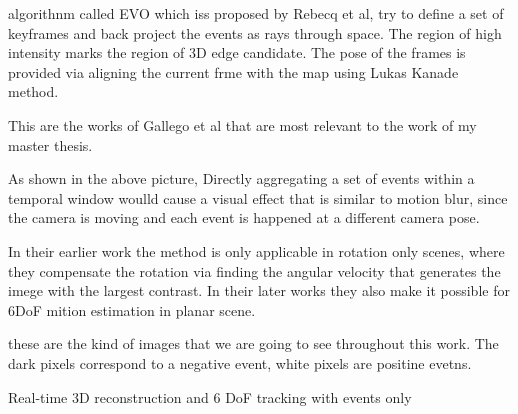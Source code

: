 algorithnm called EVO which iss proposed by Rebecq et al, try to
define a set of keyframes and back project the events as rays through
space. The region of high intensity marks the region of 3D edge
candidate. The pose of the frames is provided via aligning the current
frme with the map using Lukas Kanade method.


This are the works of Gallego et al that are most relevant to the work
of my master thesis. 
 
 As shown in the above picture, Directly
aggregating a set of events within a temporal window woulld cause a
visual effect that is similar to motion blur, since the camera is
moving and each event is happened at a different camera pose. 
 
 In
their earlier work the method is only applicable in rotation only
scenes, where they compensate the rotation via finding the angular
velocity that generates the imege with the largest contrast. In their
later works they also make it possible for 6DoF mition estimation in
planar scene. 
 
 these are the kind of images that we are going to
see throughout this work. The dark pixels correspond to a negative
event, white pixels are positine evetns.


Real-time 3D reconstruction and 6 DoF tracking with events only
\citep{kim2016real,rebecq2017evo}

